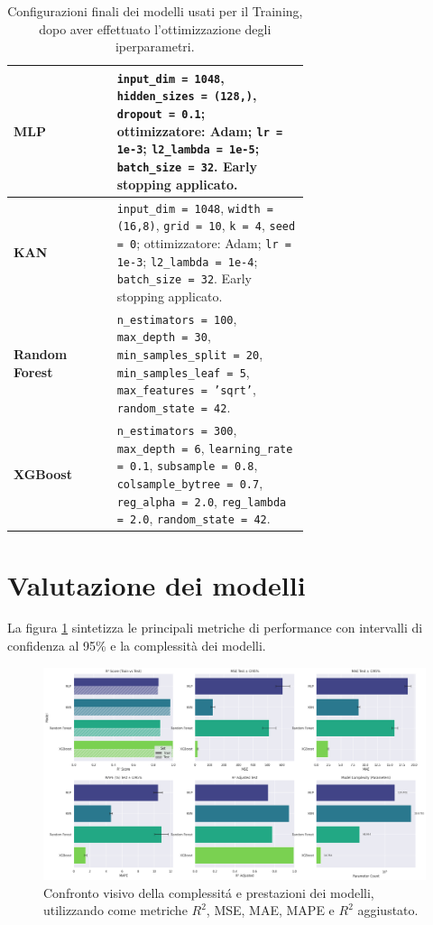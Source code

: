 \documentclass[a4paper,12pt]{report}
\begin{document}
	\begin{table}[H]
		\centering
		\caption{Configurazioni finali dei modelli usati per il Training, dopo aver effettuato l'ottimizzazione degli iperparametri.}
		\label{tab:model-config-car}
		\begin{tabular}{l p{0.65\linewidth}}
			\toprule
			\textbf{MLP} & \texttt{input\_dim = 1048}, \texttt{hidden\_sizes = (128,)}, \texttt{dropout = 0.1}; ottimizzatore: Adam; \texttt{lr = 1e-3}; \texttt{l2\_lambda = 1e-5}; \texttt{batch\_size = 32}. Early stopping applicato. \\
			\midrule
			\textbf{KAN} & \texttt{input\_dim = 1048}, \texttt{width = (16,8)}, \texttt{grid = 10}, \texttt{k = 4}, \texttt{seed = 0}; ottimizzatore: Adam; \texttt{lr = 1e-3}; \texttt{l2\_lambda = 1e-4}; \texttt{batch\_size = 32}. Early stopping applicato. \\
			\midrule
			\textbf{Random Forest} & \texttt{n\_estimators = 100}, \texttt{max\_depth = 30}, \texttt{min\_samples\_split = 20}, \texttt{min\_samples\_leaf = 5}, \texttt{max\_features = 'sqrt'}, \texttt{random\_state = 42}. \\
			\midrule
			\textbf{XGBoost} & \texttt{n\_estimators = 300}, \texttt{max\_depth = 6}, \texttt{learning\_rate = 0.1}, \texttt{subsample = 0.8}, \texttt{colsample\_bytree = 0.7}, \texttt{reg\_alpha = 2.0}, \texttt{reg\_lambda = 2.0}, \texttt{random\_state = 42}. \\
			\bottomrule
		\end{tabular}
	\end{table}
	
	\section{Valutazione dei modelli}
	
	La figura \ref{fig:comparison_models} sintetizza le principali metriche di performance con intervalli di confidenza al 95\% e la complessità dei modelli.
	
	\begin{figure}[H]
		\centering
		\includegraphics[width=1.0\textwidth]{img/comparison_car.png}
		\caption{Confronto visivo della complessitá e prestazioni dei modelli, utilizzando come metriche $R^2$, MSE, MAE, MAPE e $R^2$ aggiustato.}
		\label{fig:comparison_models}
	\end{figure}
	
\end{document}
